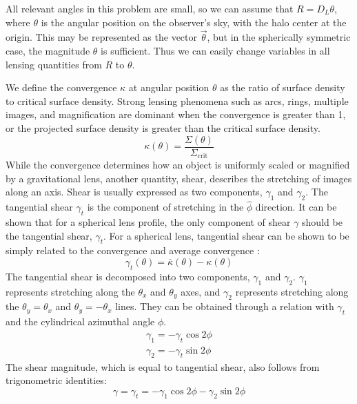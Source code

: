 \documentclass[10pt]{article}
\begin{document}
All relevant angles in this problem are small, so we can assume that $R = D_L \theta$, where $\theta$ is the angular position on the observer's sky, with the halo center at the origin. This may be represented as the vector $\vec{\theta}$, but in the spherically symmetric case, the magnitude $\theta$ is sufficient. Thus we can easily change variables in all lensing quantities from $R$ to $\theta$.

We define the convergence $\kappa$ at angular position $\theta$ as the ratio of surface density to critical surface density. Strong lensing phenomena such as arcs, rings, multiple images, and magnification are dominant when the convergence is greater than 1, or the projected surface density is greater than the critical surface density.
\begin{equation} \label{convergence}
\kappa(\theta) = \frac{\Sigma(\theta)}{\Sigma_\mathrm{crit}}
\end{equation}
While the convergence determines how an object is uniformly scaled or magnified by a gravitational lens, another quantity, shear, describes the stretching of images along an axis. Shear is usually expressed as two components, $\gamma_1$ and $\gamma_2$. The tangential shear $\gamma_t$ is the component of stretching in the $\hat{\phi}$ direction. It can be shown that for a spherical lens profile, the only component of shear $\gamma$ should be the tangential shear, $\gamma_t$. For a spherical lens, tangential shear can be shown to be simply related to the convergence and average convergence \citep{Dodelson2017}:
\begin{equation} \label{tangentialshear}
\gamma_t(\theta) = \overline{\kappa}(\theta) - \kappa(\theta)
\end{equation}
The tangential shear is decomposed into two components, $\gamma_1$ and $\gamma_2$. $\gamma_1$ represents stretching along the $\theta_x$ and $\theta_y$ axes, and $\gamma_2$ represents stretching along the $\theta_y = \theta_x$ and $\theta_y = - \theta_x$ lines. They can be obtained through a relation with $\gamma_t$ and the cylindrical azimuthal angle $\phi$.
\begin{equation}
\begin{split}
\gamma_1 = -\gamma_t \cos{2\phi}\\
\gamma_2 = -\gamma_t \sin{2\phi}
\end{split}
\end{equation}
The shear magnitude, which is equal to tangential shear, also follows from trigonometric identities:
\begin{equation}
\gamma = \gamma_t = -\gamma_1 \cos{2\phi} -\gamma_2 \sin{2\phi}
\end{equation}
\end{document}

